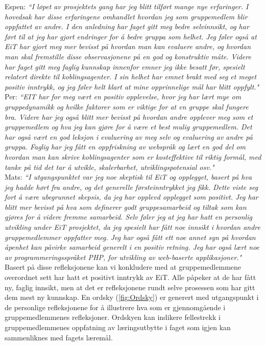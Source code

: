 Espen: \textit{``I løpet av prosjektets gang har jeg blitt tilført mange nye erfaringer. I hovedsak har disse erfaringene omhandlet hvordan jeg som gruppemedlem blir oppfattet av andre. I den anledning har faget gitt meg bedre selvinnsikt, og har ført til at jeg har gjort endringer for å bedre gruppa som helhet. Jeg føler også at EiT har gjort meg mer bevisst på hvordan man kan evaluere andre, og hvordan man skal fremstille disse observasjonene på en god og konstruktiv måte. Videre har faget gitt meg faglig kunnskap innenfor emner jeg ikke besatt før, spesielt relatert direkte til koblingsagenter. I sin helhet har emnet brakt med seg et meget positiv inntrykk, og jeg føler helt klart at mine opprinnelige mål har blitt oppfylt."}\\

Per: \textit{``EIT har for meg vært en positiv opplevelse, hvor jeg har lært mye om gruppedynamikk og hvilke faktorer som er viktige for at en gruppe skal fungere bra. Videre har jeg også blitt mer bevisst på hvordan andre opplever meg som et gruppemedlem og hva jeg kan gjøre for å være et best mulig gruppemedlem. Det har også vært en god leksjon i evaluering av meg selv og evaluering av andre på gruppa. Faglig har jeg fått en oppfriskning av webspråk og lært en god del om hvordan man kan skrive koblingsagenter som er kosteffektive til riktig formål, med tanke på tid det tar å utvikle, skalerbarhet, utviklingspotensial osv."}\\

Mats: \textit{``I utgangspunktet var jeg noe skeptisk til EiT og opplegget, basert på hva jeg hadde hørt fra andre, og det generelle førsteinntrykket jeg fikk. Dette viste seg fort å være ubegrunnet skepsis, da jeg har opplevd opplegget som positivt. Jeg har blitt mer bevisst på hva som definerer godt gruppesamarbeid og tiltak som kan gjøres for å videre fremme samarbeid.  Selv føler jeg at jeg har hatt en personlig utvikling under EiT prosjektet, da jeg spesielt har fått noe innsikt i hvordan andre gruppemedlemmer oppfatter meg. Jeg har også fått ett noe annet syn på hvordan åpenhet kan påvirke samarbeid generelt i en positiv retning. Jeg har også lært noe av programmeringsspråket PHP, for utvikling av web-baserte applikasjoner."}\\

Basert på disse refleksjonene kan vi konkludere med at gruppemedlemmene overordnet sett har hatt et positivt inntrykk av EiT. Alle påpeker at de har fått ny, faglig innsikt, men at det er refleksjonene rundt selve prosessen som har gitt dem mest ny kunnskap. En ordsky (\ref{fig:Ordsky}) er generert med utgangspunkt i de personlige refleksjonene for å illustrere hva som er gjennomgående i gruppemedlemmenes refleksjoner. Ordskyen kan indikere fellestrekk i gruppemedlemmenes oppfatning av læringsutbytte i faget som igjen kan sammenliknes med fagets læremål.\\


